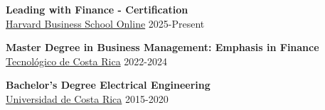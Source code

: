     \begin{tcolorbox}[ title= Education \faUserGraduate \hspace{0mm} , colframe=blue!25!black]
    
        \textbf{Leading with Finance - Certification } \\
        \faMapMarker \hspace{0mm} \href{https://online.hbs.edu/courses/leading-with-finance/}{Harvard Business School Online} \hspace{9cm} \faCalendar \hspace{0mm} 2025-Present
        
        \tcbline
        
        \textbf{Master Degree in Business Management: Emphasis in Finance} \\
        \faMapMarker \hspace{0mm} \href{https://www.tec.ac.cr/}{Tecnológico de Costa Rica} \hspace{9.9cm} \faCalendar \hspace{0mm} 2022-2024
        
        \tcbline
        

        \textbf{Bachelor's Degree Electrical Engineering} \\
        \faMapMarker \hspace{0mm} \href{https://www.ucr.ac.cr/}{Universidad de Costa Rica} \hspace{9.9cm} \faCalendar \hspace{0mm} 2015-2020
        
        

    
    \end{tcolorbox}
